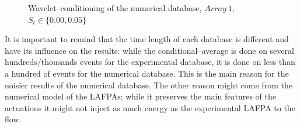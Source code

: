 \documentclass[english]{aiaa-tc}
\begin{document}
\begin{figure}[!ht]
\begin{center}
\begin{centering}
\end{centering}
\caption{Wavelet--conditioning of the numerical database, $Array~1$, $S_t \in \{0.00, 0.05\}$}
\label{fig:numericalConditioning1}
\end{center}
\end{figure}

It is important to remind that the time length of each database is different and have its influence on the results: while the conditional--average is done on several hundreds/thousands events for the experimental database, it is done on less than a hundred of events for the numerical database. This is the main reason for the noisier results of the numerical database.
The other reason might come from the numerical model of the LAFPAs: while it preserves the main features of the actuations it might not inject as much energy as the experimental LAFPA to the flow.
\end{document}
